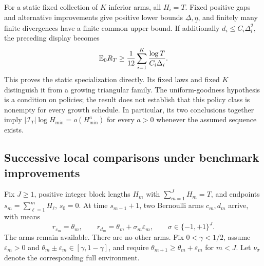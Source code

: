 For a static fixed collection of $K$ inferior arms, all $H_i=T$.
Fixed positive gaps and alternative improvements give positive lower
bounds $\underline\Delta,\underline\eta$, and finitely many finite
divergences have a finite common upper bound. If additionally
$d_i\le C_i\Delta_i^2$, the preceding display becomes
\[
 \mathbb E_0R_T\ge\frac1{12}\sum_{i=1}^K
                              \frac{\log T}{C_i\Delta_i}.
\]
This proves the static specialization directly. Its fixed laws and
fixed $K$ distinguish it from a growing triangular family. The
uniform-goodness hypothesis is a condition on policies; the result
does not establish that this policy class is nonempty for every
growth schedule. In particular, its two conclusions together imply
$|\mathcal I_T|\log H_{\min}=o(H_{\min}^a)$ for every $a>0$ whenever
the assumed sequence exists.

\subsection{Successive local comparisons under benchmark improvements}

Fix $J\ge1$, positive integer block lengths $H_m$ with
$\sum_{m=1}^JH_m=T$, and endpoints $s_m=\sum_{\ell=1}^mH_\ell$,
$s_0=0$. At time $s_{m-1}+1$, two Bernoulli arms $c_m,d_m$ arrive,
with means
\[
 r_{c_m}=\theta_m,\qquad
 r_{d_m}=\theta_m+\sigma_m\varepsilon_m,
 \qquad \sigma\in\{-1,+1\}^J.
\]
The arms remain available. There are no other arms. Fix
$0<\gamma<1/2$, assume $\varepsilon_m>0$ and
$\theta_m\pm\varepsilon_m\in[\gamma,1-\gamma]$, and require
$\theta_{m+1}\ge\theta_m+\varepsilon_m$ for $m<J$.
Let $\nu_\sigma$ denote the corresponding full environment.

